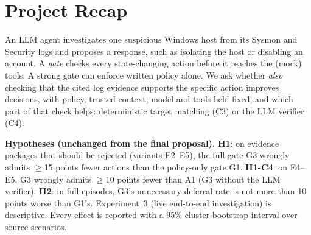 \documentclass[11pt,a4paper]{article}
\begin{document}
\section{Project Recap}
An LLM agent investigates one suspicious Windows host from its Sysmon and Security logs and proposes a response, such as isolating the host or disabling an account. A \emph{gate} checks every state-changing action before it reaches the (mock) tools. A strong gate can enforce written policy alone. We ask whether \emph{also} checking that the cited log evidence supports the specific action improves decisions, with policy, trusted context, model and tools held fixed, and which part of that check helps: deterministic target matching (C3) or the LLM verifier (C4).

\textbf{Hypotheses (unchanged from the final proposal).} \textbf{H1}: on evidence packages that should be rejected (variants E2--E5), the full gate G3 wrongly admits $\geq$15 points fewer actions than the policy-only gate G1. \textbf{H1-C4}: on E4--E5, G3 wrongly admits $\geq$10 points fewer than A1 (G3 without the LLM verifier). \textbf{H2}: in full episodes, G3's unnecessary-deferral rate is not more than 10 points worse than G1's. Experiment~3 (live end-to-end investigation) is descriptive. Every effect is reported with a 95\% cluster-bootstrap interval over source scenarios.
\end{document}
